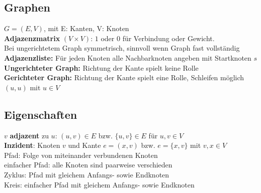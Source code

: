 \documentclass[fs, footer]{latex4ei}
\begin{document}
\begin{multicols*}{4}
{{




\section{Graphen}
$G = (E, V)$, mit E: Kanten, V: Knoten\\
\textbf{Adjazenzmatrix} $(V \times V)$: $1$ oder $0$ für Verbindung oder Gewicht.\\
Bei ungerichtetem Graph symmetrisch, sinnvoll wenn Graph fast vollständig\\
\textbf{Adjazenzliste:} Für jeden Knoten alle Nachbarknoten angeben mit Startknoten $s$\\

\textbf{Ungerichteter Graph:} Richtung der Kante spielt keine Rolle\\
\textbf{Gerichteter Graph:} Richtung der Kante spielt eine Rolle, Schleifen möglich $(u, u)$ mit $u \in V$\\

\subsection{Eigenschaften}
$v$ \textbf{adjazent} zu $u$: $(u,v) \in E$ bzw. $\{u, v\} \in E$ für $u, v \in V$\\
\textbf{Inzident}: Knoten $v$ und Kante $e = (x, v)$ bzw. $e = \{x, v\}$ mit $v, x \in V$\\

Pfad: Folge von miteinander verbundenen Knoten\\
einfacher Pfad: alle Knoten sind paarweise verschieden\\
Zyklus: Pfad mit gleichem Anfangs- sowie Endknoten\\
Kreis: einfacher Pfad mit gleichem Anfangs- sowie Endknoten\\

}}
\end{multicols*}
\end{document}
